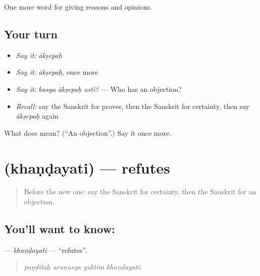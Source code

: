 \begin{grammarlens}[title={What you've built}]
One more word for giving reasons and opinions.
\end{grammarlens}

\subsection*{Your turn}
\begin{itemize}
\raggedright
  \item \emph{Say it:} \emph{ākṣepaḥ}
  \item \emph{Say it:} \emph{ākṣepaḥ}, once more
  \item \emph{Say it:} \emph{kasya ākṣepaḥ asti?} — Who has an objection?
  \item \emph{Recall:} say the Sanskrit for proves, then the Sanskrit for certainty, then say \emph{ākṣepaḥ} again
\end{itemize}

\begin{tcolorbox}[breakable,colback=teal!4,colframe=teal!35!black,title={Before you move on}]
What does  mean? (\textquotedblleft{}An objection\textquotedblright{}.) Say it once more.
\end{tcolorbox}
\section[\texorpdfstring{\sk{खण्डयति} (khaṇḍayati)}{खण्डयति (khaṇḍayati)}]{ (khaṇḍayati) — refutes}

\label{lesson:SA-C346-khandayati}



\begin{quote}
Before the new one: say the Sanskrit for certainty, then the Sanskrit for an objection.
\end{quote}

\subsection*{You'll want to know: }
\textbf{} — \emph{khaṇḍayati} — \textquotedblleft{}refutes\textquotedblright{}.

\begin{quote}
   
\end{quote}

\begin{quote}
\emph{paṇḍitaḥ aruṇasya yuktiṃ khaṇḍayati.}
\end{quote}

